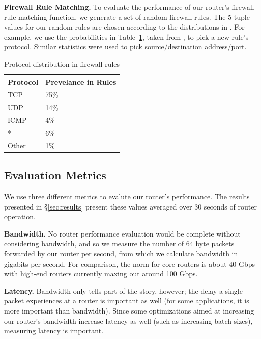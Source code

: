 \noindent \textbf{Firewall Rule Matching.} To evaluate the performance of our
router's firewall rule matching function, we generate a set of random firewall
rules. The 5-tuple values for our random rules are chosen according to the
distributions in \cite{Rovniagin}. For example, we use the probabilities in
Table~\ref{tab:proto-dist}, taken from \cite{Rovniagin}, to pick a new rule's
protocol. Similar statistics were used to pick source/destination address/port.

\begin{table}[htbp]
   \centering
   \begin{tabular}{ l l } 
      \toprule
      \textbf{Protocol}  & \textbf{Prevelance in Rules} \\
      \midrule
	  TCP & 75\% \\
      UDP & 14\% \\
	  ICMP & 4\% \\
	  * & 6\% \\
	  Other & 1\% \\
      \bottomrule
   \end{tabular}
   \caption{Protocol distribution in firewall rules}
   \label{tab:proto-dist}
\end{table}

\subsection{Evaluation Metrics}
\label{sec:metrics}

We use three different metrics to evalute our router's performance. The results
presented in \S\ref{sec:results} present these values averaged over 30 seconds
of router operation.

\medskip \noindent \textbf{Bandwidth.} No router performance evaluation would
be complete without considering bandwidth, and so we measure the number of 64
byte packets forwarded by our router per second, from which we calculate
bandwidth in gigabits per second. For comparison, the norm for core routers is
about 40 Gbps with high-end routers currently maxing out around 100 Gbps.

\medskip \noindent \textbf{Latency.} Bandwidth only tells part of the story,
however; the delay a single packet experiences at a router is important as well
(for some applications, it is more important than bandwidth). Since some
optimizations aimed at increasing our router's bandwidth increase latency as
well (such as increasing batch sizes), measuring latency is important.

